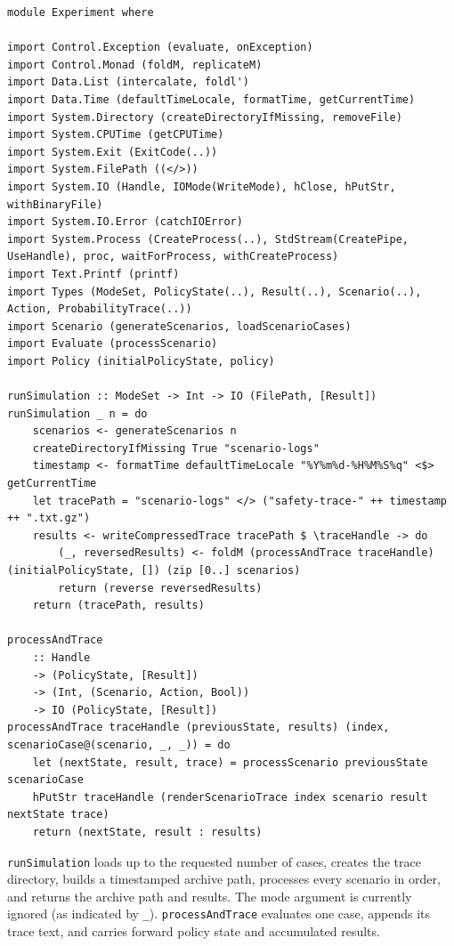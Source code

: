 \documentclass[11pt]{article}
\begin{document}
\begin{lstlisting}
module Experiment where

import Control.Exception (evaluate, onException)
import Control.Monad (foldM, replicateM)
import Data.List (intercalate, foldl')
import Data.Time (defaultTimeLocale, formatTime, getCurrentTime)
import System.Directory (createDirectoryIfMissing, removeFile)
import System.CPUTime (getCPUTime)
import System.Exit (ExitCode(..))
import System.FilePath ((</>))
import System.IO (Handle, IOMode(WriteMode), hClose, hPutStr, withBinaryFile)
import System.IO.Error (catchIOError)
import System.Process (CreateProcess(..), StdStream(CreatePipe, UseHandle), proc, waitForProcess, withCreateProcess)
import Text.Printf (printf)
import Types (ModeSet, PolicyState(..), Result(..), Scenario(..), Action, ProbabilityTrace(..))
import Scenario (generateScenarios, loadScenarioCases)
import Evaluate (processScenario)
import Policy (initialPolicyState, policy)

runSimulation :: ModeSet -> Int -> IO (FilePath, [Result])
runSimulation _ n = do
    scenarios <- generateScenarios n
    createDirectoryIfMissing True "scenario-logs"
    timestamp <- formatTime defaultTimeLocale "%Y%m%d-%H%M%S%q" <$> getCurrentTime
    let tracePath = "scenario-logs" </> ("safety-trace-" ++ timestamp ++ ".txt.gz")
    results <- writeCompressedTrace tracePath $ \traceHandle -> do
        (_, reversedResults) <- foldM (processAndTrace traceHandle) (initialPolicyState, []) (zip [0..] scenarios)
        return (reverse reversedResults)
    return (tracePath, results)

processAndTrace
    :: Handle
    -> (PolicyState, [Result])
    -> (Int, (Scenario, Action, Bool))
    -> IO (PolicyState, [Result])
processAndTrace traceHandle (previousState, results) (index, scenarioCase@(scenario, _, _)) = do
    let (nextState, result, trace) = processScenario previousState scenarioCase
    hPutStr traceHandle (renderScenarioTrace index scenario result nextState trace)
    return (nextState, result : results)
\end{lstlisting}

\texttt{runSimulation} loads up to the requested number of cases, creates the
trace directory, builds a timestamped archive path, processes every scenario
in order, and returns the archive path and results. The mode argument is
currently ignored (as indicated by \texttt{\_}). \texttt{processAndTrace}
evaluates one case, appends its trace text, and carries forward policy state
and accumulated results.
\end{document}
